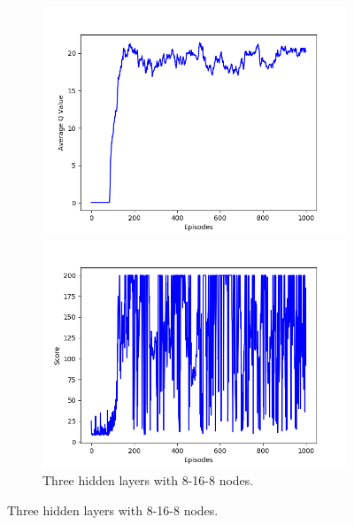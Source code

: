 \documentclass{article}
\begin{document}
\begin{figure}[!htbp]
  \begin{subfigure}{\textwidth}
    \begin{minipage}{0.5\textwidth}
      \centering
      \includegraphics[scale=0.45]{../experiments/nn_size_8_16_8/qvalues.png}
    \end{minipage}
    \begin{minipage}{0.5\textwidth}
      \centering
      \includegraphics[scale=0.45]{../experiments/nn_size_8_16_8/scores.png}
    \end{minipage}
    \caption{Three hidden layers with 8-16-8 nodes.}
  \end{subfigure}%


\end{figure}
\end{document}
